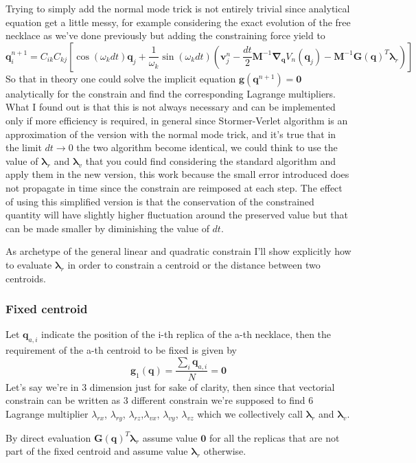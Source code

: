 \documentclass[10pt,a4paper]{article}
\begin{document}
Trying to simply add the normal mode trick is not entirely trivial since analytical equation get a little messy, for example considering the exact evolution of the free necklace as we've done previously but adding the constraining force yield to
\[ \bm{q}_i^{n+1}=C_{ik}C_{kj}[\cos(\omega_kdt)\bm{q}_j+\frac{1}{\omega_k}\sin(\omega_kdt)(\bm{v}_j^n-\frac{dt}{2}\bm{M}^{-1} \bm{\nabla}_{\bm{q}}V_n(\bm{q}_j) -\bm{M}^{-1} \bm{G}(\bm{q})^T\bm{\lambda}_r )]  \] 
So that in theory one could solve the implicit equation $\bm{g}(\bm{q}^{n+1}) = \bm{0}$ analytically for the constrain and find the corresponding Lagrange multipliers. What I found out is that this is not always necessary and can be implemented only if more efficiency is required, in general since Stormer-Verlet algorithm is an approximation of the version with the normal mode trick, and it's true that in the limit $dt \rightarrow 0$ the two algorithm become identical, we could think to use the value of $\bm{\lambda}_r$ and $\bm{\lambda}_v$ that you could find considering the standard algorithm and apply them in the new version, this work because the small error introduced does not propagate in time since the constrain are reimposed at each step. The effect of using this simplified version is that the conservation of the constrained quantity will have slightly higher fluctuation around the preserved value but that can be made smaller by diminishing the value of $dt$.

As archetype of the general linear and quadratic constrain I'll show explicitly how to evaluate $\bm{\lambda}_r$ in order to constrain a centroid or the distance between two centroids.
\subsubsection{Fixed centroid}
Let $\bm{q}_{a,i}$ indicate the position of the i-th replica of the a-th necklace, then the requirement of the a-th centroid to be fixed is given by
\[\bm{g}_1 (\bm{q})= \frac{\sum_i \bm{q}_{a,i}}{N} = 	\bm0 \]
Let's say we're in $3$ dimension just for sake of clarity, then since that vectorial constrain can be written as $3$ different constrain we're supposed to find $6$ Lagrange multiplier $\lambda_{rx}$, $\lambda_{ry}$, $\lambda_{rz}$,$\lambda_{vx}$, $\lambda_{vy}$, $\lambda_{vz}$ which we collectively call $\bm{\lambda}_r$ and $\bm{\lambda}_v$.

By direct evaluation $\bm{G}(\bm{q})^T\bm{\lambda}_r$ assume value $\bm{0}$ for all the replicas that are not part of the fixed centroid and assume value $\bm{\lambda}_r$ otherwise.
\end{document}
